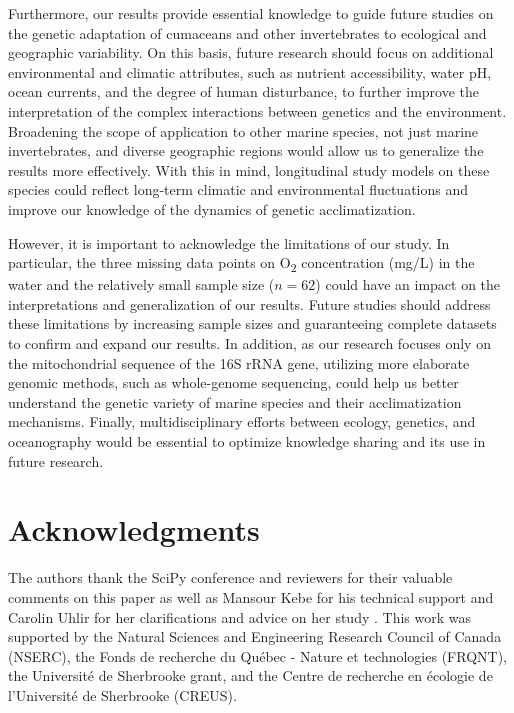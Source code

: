 Furthermore, our results provide essential knowledge to guide future studies on the genetic adaptation of cumaceans and other invertebrates to ecological and geographic variability. On this basis, future research should focus on additional environmental and climatic attributes, such as nutrient accessibility, water pH, ocean currents, and the degree of human disturbance, to further improve the interpretation of the complex interactions between genetics and the environment. Broadening the scope of application to other marine species, not just marine invertebrates, and diverse geographic regions would allow us to generalize the results more effectively. With this in mind, longitudinal study models on these species could reflect long-term climatic and environmental fluctuations and improve our knowledge of the dynamics of genetic acclimatization.

However, it is important to acknowledge the limitations of our study. In particular, the three missing data points on O\textsubscript{2} concentration (mg/L) in the water and the relatively small sample size ($n=62$) could have an impact on the interpretations and generalization of our results. Future studies should address these limitations by increasing sample sizes and guaranteeing complete datasets to confirm and expand our results. In addition, as our research focuses only on the mitochondrial sequence of the 16S rRNA gene, utilizing more elaborate genomic methods, such as whole-genome sequencing, could help us better understand the genetic variety of marine species and their acclimatization mechanisms. Finally, multidisciplinary efforts between ecology, genetics, and oceanography would be essential to optimize knowledge sharing and its use in future research.

\section{Acknowledgments}\label{acknowledgments}
The authors thank the SciPy conference and reviewers for their valuable comments on this paper as well as Mansour Kebe for his technical support and Carolin Uhlir for her clarifications and advice on her study \citep{uhlir_adding_2021}. This work was supported by the Natural Sciences and Engineering Research Council of Canada (NSERC), the Fonds de recherche du Québec - Nature et technologies (FRQNT), the Université de Sherbrooke grant, and the Centre de recherche en écologie de l’Université de Sherbrooke (CREUS).
